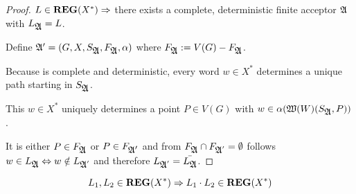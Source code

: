 \begin{proof}
$L \in \mbox{{\bf REG}}(X^*) \Rightarrow $ there exists a complete, deterministic
finite acceptor $\mbox{$\mathfrak{A}$}$ with $L_{\mbox{$\mathfrak{A}$}} = L$.

Define $\mbox{$\mathfrak{A'}$} = (G, X, S_{\mbox{$\mathfrak{A}$}}, F_{\mbox{$\mathfrak{A}$}}, \alpha)$ where $F_{\mbox{$\mathfrak{A}$}} :=
V(G) - F_{\mbox{$\mathfrak{A}$}}$.

Because  is complete and deterministic, every word $w \in X^*$ determines
a unique path starting in $S_{\mbox{$\mathfrak{A}$}}$.

This $w \in X^*$ uniquely determines a point $P \in V(G)$ with $w \in
\alpha(\mbox{$\mathfrak{W}({W})$}(S_{\mbox{$\mathfrak{A}$}}, P))$.

It is either $P \in F_{\mbox{$\mathfrak{A}$}}$ or $P \in F_{\mbox{$\mathfrak{A'}$}}$ and from $F_{\mbox{$\mathfrak{A}$}}
\cap F_{\mbox{$\mathfrak{A}$}'} = \emptyset$ follows $w \in L_{\mbox{$\mathfrak{A}$}} \Leftrightarrow w
\notin L_{\mbox{$\mathfrak{A}$}'}$ and therefore $L_{\mbox{$\mathfrak{A}$}'} = \bar{L_{\mbox{$\mathfrak{A}$}}}$.
\end{proof}

\bigskip
\begin{theorem}
\[ L_1, L_2 \in \mbox{{\bf REG}}(X^*) \Rightarrow L_1 \cdot L_2 \in \mbox{{\bf REG}}(X^*) \]
\end{theorem}

